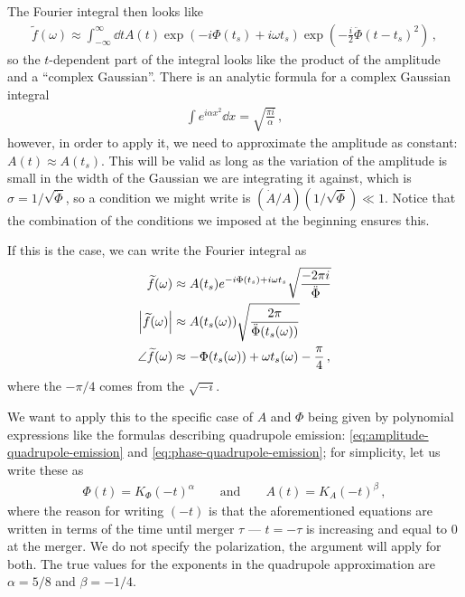 \documentclass[main.tex]{subfiles}
\begin{document}
The Fourier integral then looks like 
%
\begin{align}
\widetilde{f}(\omega ) \approx \int_{-\infty }^{\infty } \dd{t} A(t) \exp(-i \Phi (t_s) + i \omega t_s) \exp(- \frac{i}{2} \ddot{\Phi} (t-t_s)^2)
\,,
\end{align}
%
so the \(t\)-dependent part of the integral looks like the product of the amplitude and a ``complex Gaussian''. There is an analytic formula for a complex Gaussian integral 
%
\begin{align}
\int e^{i \alpha x^2} \dd{x} = \sqrt{\frac{\pi i}{\alpha }}
\,,
\end{align}
%
however, in order to apply it, we need to approximate the amplitude as constant: \(A(t) \approx A(t_s)\). This will be valid as long as the variation of the amplitude is small in the width of the Gaussian we are integrating it against, which is \(\sigma = 1 / \sqrt{\ddot{\Phi}}\), so a condition we might write is \((\dot{A} / A) (1/\sqrt{\ddot{\Phi}}) \ll 1\). 
Notice that the combination of the conditions we imposed at the beginning ensures this.

If this is the case, we can write the Fourier integral as 
%
\begin{subequations}
\begin{align}
\widetilde{f}(\omega ) &\approx A(t_s) e^{- i \Phi (t_s) + i \omega t_s} \sqrt{\frac{- 2 \pi i}{\ddot{\Phi}}}   \\
\abs{\widetilde{f}(\omega )} &\approx A(t_s (\omega )) \sqrt{\frac{2 \pi }{\ddot{\Phi} (t_s (\omega ))}}  \\
\angle \widetilde{f}(\omega ) &\approx - \Phi (t_s (\omega )) + \omega t_s (\omega ) - \frac{\pi}{4}
\,,
\end{align}
\end{subequations}
%
where the \(- \pi /4\) comes from the \(\sqrt{-i}\). 

We want to apply this to the specific case of \(A\) and \(\Phi \) being given by polynomial expressions like the formulas describing quadrupole emission: \eqref{eq:amplitude-quadrupole-emission} and \eqref{eq:phase-quadrupole-emission}; for simplicity, let us write these as 
%
\begin{align}
\Phi (t) = K_\Phi (- t)^{\alpha }
\qquad \text{and} \qquad
A(t) = K_A (-t)^{\beta }
\,,
\end{align}
%
where the reason for writing \((-t)\) is that the aforementioned equations are written in terms of the time until merger \(\tau \) --- \(t = -\tau \) is increasing and equal to 0 at the merger.
We do not specify the polarization, the argument will apply for both. 
The true values for the exponents in the quadrupole approximation are \(\alpha = 5/8\) and \(\beta = -1/4\). 
\end{document}
